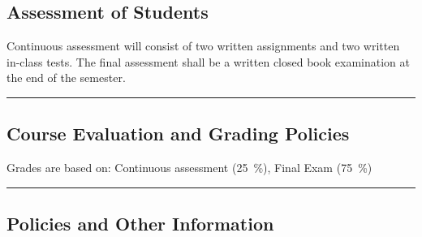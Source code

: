 \subsection*{Assessment of Students}
\begin{outline}
    \1 Continuous assessment will consist of two written assignments and two written in-class tests.
    \1 The final assessment shall be a written closed book examination at the end of the semester.
\end{outline}
\vspace{2ex}\hrule\vspace{2ex}

\subsection*{Course Evaluation and Grading Policies}
Grades are based on:
Continuous assessment (\qty{25}{\percent}),
Final Exam (\qty{75}{\percent})
\vspace{2ex}\hrule\vspace{2ex}


\subsection*{Policies and Other Information}
